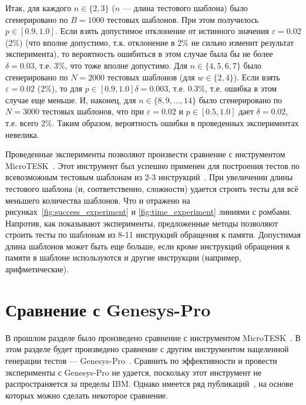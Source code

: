 \documentclass[14pt]{extreport}
\begin{document}
Итак, для каждого $n \in \{2,3\}$ ($n$ --- длина тестового шаблона) было сгенерировано по $B = 1000$ тестовых шаблонов. При этом получилось $p \in [0.9, 1.0]$. Если взять допустимое отклонение от истинного значения $\varepsilon = 0.02$ (2\%) (что вполне допустимо, т.к. отклонение в 2\% не сильно изменит результат эксперимента), то вероятность ошибиться в этом случае была бы не более $\delta = 0.03$, т.е. 3\%, что тоже вполне допустимо. Для $n \in \{4, 5, 6, 7\}$ было сгенерировано по $N = 2000$ тестовых шаблонов (для $w \in \{2,4\}$). Если взять $\varepsilon = 0.02$ (2\%), то для $p \in [0.9, 1.0] \delta = 0.003$, т.е. $0.3\%$, т.е. ошибка в этом случае еще меньше. И, наконец, для $n \in \{8, 9, ..., 14\}$ было сгенерировано по $N = 3000$ тестовых шаблонов, что при $\varepsilon = 0.02$ и $p \in [0.5, 1.0]$ дает $\delta = 0.02$, т.е. всего 2\%. Таким образом, вероятность ошибки в проведенных экспериментах невелика.

Проведенные эксперименты позволяют произвести сравнение с инструментом
MicroTESK~\cite{MicroTESK}. Этот инструмент был успешно применен для построения
тестов по всевозможным тестовым шаблонам из 2-3 инструкций~\cite{vorobyev}. При
увеличении длины тестового шаблона (и, соответственно, сложности) удается
строить тесты для всё меньшего количества шаблонов. Что и отражено на
рисунках~\ref{fig:success_experiment} и \ref{fig:time_experiment} линиями с
ромбами. Напротив, как показывают эксперименты, предложенные методы позволяют
строить тесты по шаблонам из 8-11 инструкций обращения к памяти. Допустимая
длина шаблонов может быть еще больше, если кроме инструкций обращения к памяти в
шаблоне используются и другие инструкции (например, арифметические).

\section{Сравнение с Genesys-Pro}

В прошлом разделе было произведено сравнение с инструментом
MicroTESK~\cite{???????}. В этом разделе будет произведено сравнение с другим
инструментом нацеленной генерации тестов --- Genesys-Pro~\cite{?????}. Сравнить
по эффективности и провести эксперименты с Genesys-Pro не удается, поскольку
этот инструмент не распространяется за пределы IBM. Однако имеется ряд
публикаций~\cite{??????}, на основе которых можно сделать некоторое сравнение.
\end{document}
